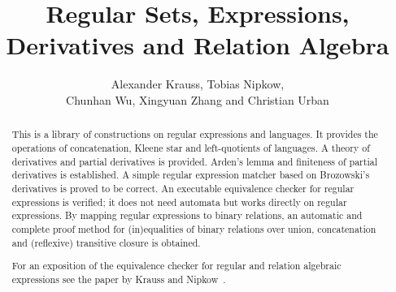 \documentclass[11pt,a4paper]{article}
\begin{document}
\title{Regular Sets, Expressions, Derivatives and Relation Algebra}
\author{Alexander Krauss, Tobias Nipkow,\\
  Chunhan Wu, Xingyuan Zhang and Christian Urban}
\maketitle

\begin{abstract}
This is a library of constructions on regular expressions and languages.  It
provides the operations of concatenation, Kleene star and left-quotients of
languages. A theory of derivatives and partial derivatives is
provided. Arden's lemma and finiteness of partial derivatives is
established. A simple regular expression matcher based on Brozowski's
derivatives is proved to be correct.  An executable equivalence checker for
regular expressions is verified; it does not need automata but works directly
on regular expressions. By mapping regular expressions to binary relations, an
automatic and complete proof method for (in)equalities of binary relations
over union, concatenation and (reflexive) transitive closure is obtained.

For an exposition of the equivalence checker for regular and relation
algebraic expressions see the paper by Krauss and Nipkow~\cite{KraussN-JAR}.
\end{abstract}

\tableofcontents





\end{document}
